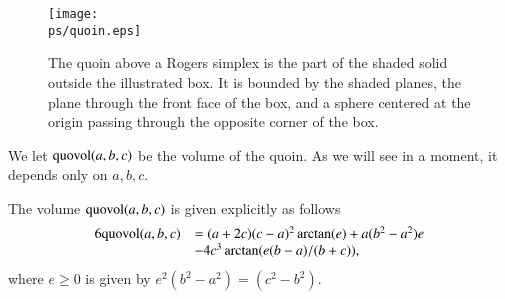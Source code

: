 \begin{figure}[htb]
  \centering
  \texttt{[image: \\ps/quoin.eps]}
  \caption{The quoin above a Rogers simplex is the part of the
  shaded solid outside
   the illustrated box.  It is bounded by the shaded planes, the plane through
   the front face of the box, and a sphere
   centered at the origin passing through the opposite corner of the box.}
  \label{fig:quoin}
\end{figure}

We let ${\operatorname{quovol}}(a,b,c)$ be the volume of the
quoin.  As we will see in a moment, it depends only on $a,b,c$.

\begin{lemma}\label{lemma:quo-vol}
The volume ${\operatorname{quovol}}(a,b,c)$ is given explicitly as follows
    \begin{equation}
    \begin{array}{lll}
    6\op{quovol}(a,b,c) &= (a+2c)  %
    (c-a)^2\arctan(e)
        +a(b^2-a^2)e\\&-4c^3\arctan(e(b-a)/(b+c)),
    \label{eqn:3.3}
    \end{array}
    \end{equation}
where $e\ge0$ is given by $e^2(b^2-a^2)=(c^2-b^2)$.
%
\end{lemma}

